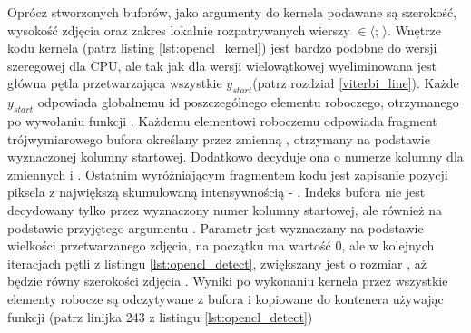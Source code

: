 \documentclass[document.tex]{subfiles}
\begin{document}
\indent Oprócz stworzonych buforów, jako argumenty do kernela podawane są szerokość, wysokość zdjęcia oraz 
zakres lokalnie rozpatrywanych wierszy  $\in \langle$;  $\rangle$.
Wnętrze kodu kernela (patrz listing \ref{lst:opencl_kernel}) jest bardzo podobne do wersji szeregowej
dla CPU, ale tak jak dla wersji wielowątkowej wyeliminowana jest główna pętla przetwarzająca wszystkie
$y_{start}$(patrz rozdział \ref{viterbi_line}). Każde $y_{start}$ odpowiada globalnemu id poszczególnego
elementu roboczego, otrzymanego po wywołaniu funkcji .
Każdemu elementowi roboczemu odpowiada fragment trójwymiarowego bufora  określany przez zmienną
, otrzymany na podstawie wyznaczonej kolumny startowej. Dodatkowo decyduje ona
o numerze kolumny dla zmiennych  i . Ostatnim wyróżniającym fragmentem kodu jest zapisanie
pozycji piksela z największą skumulowaną intensywnością - . Indeks bufora  nie jest
decydowany tylko przez wyznaczony numer kolumny startowej, ale również na podstawie przyjętego argumentu
.
\indent Parametr  jest wyznaczany na podstawie wielkości przetwarzanego zdjęcia,
na początku ma wartość 0, ale w kolejnych iteracjach pętli z listingu \ref{lst:opencl_detect},
zwiększany jest o rozmiar , aż będzie równy szerokości zdjęcia .
Wyniki po wykonaniu kernela przez wszystkie elementy robocze są odczytywane z bufora  i 
kopiowane do kontenera  używając funkcji (patrz linijka 243 z listingu
\ref{lst:opencl_detect})

 

 

\end{document}
